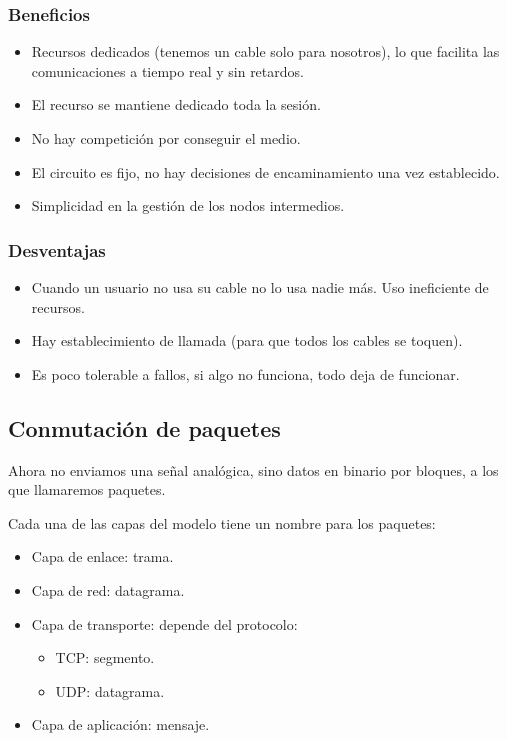 \subsubsection{Beneficios}
\begin{itemize}
    \item Recursos dedicados (tenemos un cable solo para nosotros), lo que facilita las comunicaciones a tiempo real y sin retardos.
    \item El recurso se mantiene dedicado toda la sesión.
    \item No hay competición por conseguir el medio.
    \item El circuito es fijo, no hay decisiones de encaminamiento una vez establecido.
    \item Simplicidad en la gestión de los nodos intermedios.
\end{itemize}

\subsubsection{Desventajas}
\begin{itemize}
    \item Cuando un usuario no usa su cable no lo usa nadie más. Uso ineficiente de recursos.
    \item Hay establecimiento de llamada (para que todos los cables se toquen).
    \item Es poco tolerable a fallos, si algo no funciona, todo deja de funcionar.
\end{itemize}

\subsection{Conmutación de paquetes}
Ahora no enviamos una señal analógica, sino datos en binario por bloques, a los que llamaremos paquetes. 

\begin{observacion}
    Cada una de las capas del modelo tiene un nombre para los paquetes:
    \begin{itemize}
        \item Capa de enlace: trama.
        \item Capa de red: datagrama.
        \item Capa de transporte: depende del protocolo:
            \begin{itemize}
                \item TCP\@: segmento.
                \item UDP\@: datagrama.
            \end{itemize}
        \item Capa de aplicación: mensaje. 
    \end{itemize}
\end{observacion}

